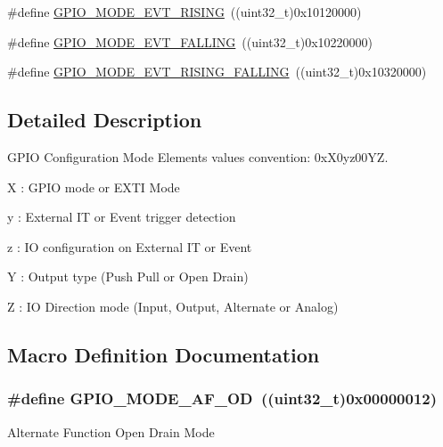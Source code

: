 \begin{DoxyCompactItemize}
\item 
\#define \hyperlink{group___g_p_i_o__mode__define_ga97d78b82ea178ff7a4c35aa60b4e9338}{G\+P\+I\+O\+\_\+\+M\+O\+D\+E\+\_\+\+E\+V\+T\+\_\+\+R\+I\+S\+I\+NG}~((uint32\+\_\+t)0x10120000)
\item 
\#define \hyperlink{group___g_p_i_o__mode__define_gadbfa532b3566783ac6c0e07c2e0ffe5e}{G\+P\+I\+O\+\_\+\+M\+O\+D\+E\+\_\+\+E\+V\+T\+\_\+\+F\+A\+L\+L\+I\+NG}~((uint32\+\_\+t)0x10220000)
\item 
\#define \hyperlink{group___g_p_i_o__mode__define_ga1b760771297ed2fc55a6b13071188491}{G\+P\+I\+O\+\_\+\+M\+O\+D\+E\+\_\+\+E\+V\+T\+\_\+\+R\+I\+S\+I\+N\+G\+\_\+\+F\+A\+L\+L\+I\+NG}~((uint32\+\_\+t)0x10320000)
\end{DoxyCompactItemize}


\subsection{Detailed Description}
G\+P\+IO Configuration Mode Elements values convention\+: 0x\+X0yz00\+YZ. 


\begin{DoxyItemize}
\item X \+: G\+P\+IO mode or E\+X\+TI Mode
\item y \+: External IT or Event trigger detection
\item z \+: IO configuration on External IT or Event
\item Y \+: Output type (Push Pull or Open Drain)
\item Z \+: IO Direction mode (Input, Output, Alternate or Analog) 
\end{DoxyItemize}

\subsection{Macro Definition Documentation}
\subsubsection[{\texorpdfstring{G\+P\+I\+O\+\_\+\+M\+O\+D\+E\+\_\+\+A\+F\+\_\+\+OD}{GPIO_MODE_AF_OD}}]{\setlength{\rightskip}{0pt plus 5cm}\#define G\+P\+I\+O\+\_\+\+M\+O\+D\+E\+\_\+\+A\+F\+\_\+\+OD~((uint32\+\_\+t)0x00000012)}\hypertarget{group___g_p_i_o__mode__define_ga282b9fd37c8ef31daba314ffae6bf023}{}\label{group___g_p_i_o__mode__define_ga282b9fd37c8ef31daba314ffae6bf023}
Alternate Function Open Drain Mode 
